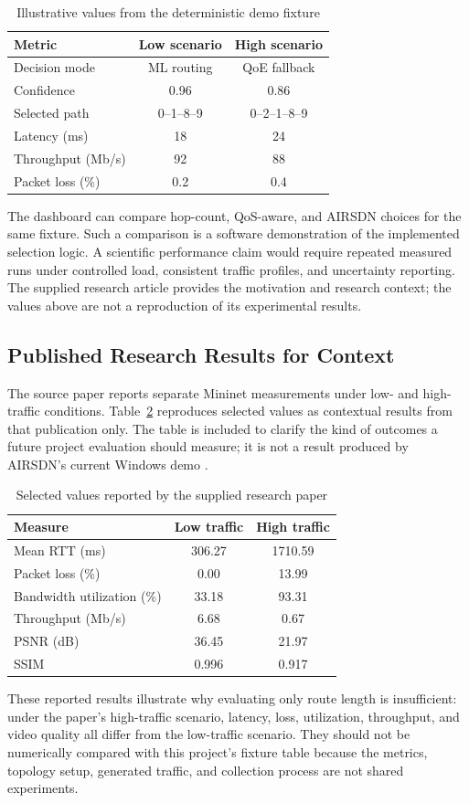 \documentclass[conference]{IEEEtran}
\begin{document}
\begin{table}[t]
\centering
\caption{Illustrative values from the deterministic demo fixture}
\label{tab:demo}
\begin{tabular}{@{}lcc@{}}
\toprule
Metric & Low scenario & High scenario \\
\midrule
Decision mode & ML routing & QoE fallback \\
Confidence & 0.96 & 0.86 \\
Selected path & 0--1--8--9 & 0--2--1--8--9 \\
Latency (ms) & 18 & 24 \\
Throughput (Mb/s) & 92 & 88 \\
Packet loss (\%) & 0.2 & 0.4 \\
\bottomrule
\end{tabular}
\end{table}

The dashboard can compare hop-count, QoS-aware, and AIRSDN choices for the same fixture. Such a comparison is a software demonstration of the implemented selection logic. A scientific performance claim would require repeated measured runs under controlled load, consistent traffic profiles, and uncertainty reporting. The supplied research article provides the motivation and research context; the values above are not a reproduction of its experimental results.

\subsection{Published Research Results for Context}
The source paper reports separate Mininet measurements under low- and high-traffic conditions. Table~\ref{tab:paper_results} reproduces selected values as contextual results from that publication only. The table is included to clarify the kind of outcomes a future project evaluation should measure; it is not a result produced by AIRSDN's current Windows demo \cite{ipek2025airsdn}.
\begin{table}[t]
\centering
\caption{Selected values reported by the supplied research paper}
\label{tab:paper_results}
\begin{tabular}{@{}lcc@{}}
\toprule
Measure & Low traffic & High traffic \\
\midrule
Mean RTT (ms) & 306.27 & 1710.59 \\
Packet loss (\%) & 0.00 & 13.99 \\
Bandwidth utilization (\%) & 33.18 & 93.31 \\
Throughput (Mb/s) & 6.68 & 0.67 \\
PSNR (dB) & 36.45 & 21.97 \\
SSIM & 0.996 & 0.917 \\
\bottomrule
\end{tabular}
\end{table}
These reported results illustrate why evaluating only route length is insufficient: under the paper's high-traffic scenario, latency, loss, utilization, throughput, and video quality all differ from the low-traffic scenario. They should not be numerically compared with this project's fixture table because the metrics, topology setup, generated traffic, and collection process are not shared experiments.
\end{document}
